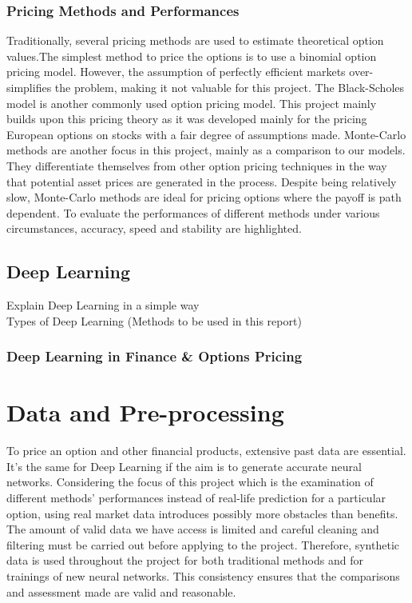 \documentclass{report}
\begin{document}
\subsection{Pricing Methods and Performances}
Traditionally, several pricing methods are used to estimate theoretical option values.The simplest method to price the options is to use a binomial option pricing model. However,  the assumption of perfectly efficient markets over-simplifies the problem, making it not valuable for this project. The Black-Scholes model is another commonly used option pricing model. This project mainly builds upon this pricing theory as it was developed mainly for the pricing European options on stocks with a fair degree of assumptions made. Monte-Carlo methods are another focus in this project, mainly as a comparison to our models. They differentiate themselves from other option pricing techniques in the way that potential asset prices are generated in the process. Despite being relatively slow, Monte-Carlo methods are ideal for pricing options where the payoff is path dependent. To evaluate the performances of different methods under various circumstances, accuracy, speed and stability are highlighted. 

\section{Deep Learning}
Explain Deep Learning in a simple way\\
Types of Deep Learning (Methods to be used in this report)

\subsection{Deep Learning in Finance & Options Pricing}


\chapter{Data and Pre-processing}
To price an option and other financial products, extensive past data are essential. It's the same for Deep Learning if the aim is to generate accurate neural networks. Considering the focus of this project which is the examination of different methods' performances instead of real-life prediction for a particular option, using real market data introduces possibly more obstacles than benefits. The amount of valid data we have access is limited and careful cleaning and filtering must be carried out before applying to the project. Therefore, synthetic data is used throughout the project for both traditional methods and for trainings of new neural networks. This consistency ensures that the comparisons and assessment made are valid and reasonable.
\end{document}
